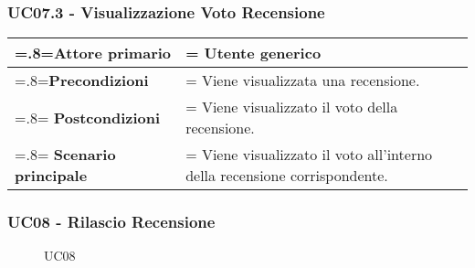         \subsubsection{UC07.3 - Visualizzazione Voto Recensione}
        \label{UC07.3}

            \begin{center}
                \renewcommand{\arraystretch}{1.5}
                \renewcommand\tabularxcolumn[1]{m{#1}}
                \begin{tabularx}{0.9\textwidth} {
                    >{\hsize=.8\hsize\linewidth=\hsize}X
                    >{\hsize=1.2\hsize\linewidth=\hsize}X}
                    \hline
                    \textbf{Attore primario} & Utente generico \\
                    \hline
                    \textbf{Precondizioni} & Viene visualizzata una recensione. \\
                    \hline
                    \textbf{Postcondizioni} & Viene visualizzato il voto della recensione. \\
                    \hline
                    \textbf{Scenario principale} & Viene visualizzato il voto all'interno della recensione corrispondente. \\
                    \hline
                \end{tabularx}
            \end{center}

        \subsubsection{UC08 - Rilascio Recensione}
        \label{UC08}

            \begin{figure}[H]
                \centering
                
                \caption{UC08}
            \end{figure}

